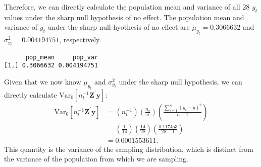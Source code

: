 \documentclass[
  12pt,
  leqno]{article}
\newenvironment{Shaded}{\begin{snugshade}}{\end{snugshade}}
\newcommand{\DecValTok}[1]{\textcolor[rgb]{0.00,0.00,0.81}{#1}}
\newcommand{\KeywordTok}[1]{\textcolor[rgb]{0.13,0.29,0.53}{\textbf{#1}}}
\newcommand{\NormalTok}[1]{#1}
\newcommand{\OperatorTok}[1]{\textcolor[rgb]{0.81,0.36,0.00}{\textbf{#1}}}
\newcommand{\StringTok}[1]{\textcolor[rgb]{0.31,0.60,0.02}{#1}}
\begin{document}
Therefore, we can directly calculate the population mean and variance of
all \(28\) \(y_t\) values under the sharp null hypothesis of no effect.
The population mean and variance of \(y_t\) under the sharp null
hyothesis of no effect are \(\mu_{y_t} = 0.3066632\) and
\(\sigma^2_{y_t} = 0.004194751\), respectively.

\begin{Shaded}
\end{Shaded}

\begin{verbatim}
      pop_mean     pop_var
[1,] 0.3066632 0.004194751
\end{verbatim}

Given that we now know \(\mu_{y_t}\) and \(\sigma^2_{y_t}\) under the
sharp null hypothesis, we can directly calculate
\(\mathrm{Var}_0\left[n_t^{-1} \mathbf{Z}^{\prime} \mathbf{y}\right]\):
\begin{align*}
\mathrm{Var}_0\left[n_t^{-1} \mathbf{Z}^{\prime} \mathbf{y}\right] & = \left(n_t^{-1}\right) \left(\frac{n_c}{n}\right) \left(\frac{\sum \limits_{i = 1}^n \left(y_i - \bar{y}\right)^2}{n - 1}\right) \\
& = \left(\frac{1}{14}\right) \left(\frac{14}{28}\right) \left(\frac{0.117453}{28 - 1}\right) \\
& = 0.0001553611.
\end{align*} This quantity is the variance of the sampling distribution,
which is distinct from the variance of the population from which we are
sampling.
\end{document}
